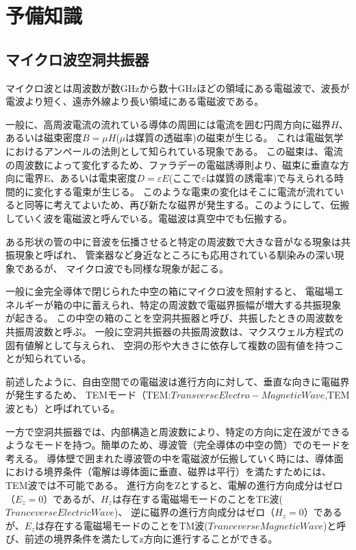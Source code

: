 \section{予備知識}
\subsection*{マイクロ波空洞共振器}
マイクロ波とは周波数が数GHzから数十GHzほどの領域にある電磁波で、波長が電波より短く、遠赤外線より長い領域にある電磁波である。

一般に、高周波電流の流れている導体の周囲には電流を囲む円周方向に磁界$H$、あるいは磁束密度$B =μH$($μ$は媒質の透磁率)の磁束が生じる。
これは電磁気学におけるアンペールの法則として知られている現象である。
この磁束は、電流の周波数によって変化するため、ファラデーの電磁誘導則より、磁束に垂直な方向に電界E、あるいは電束密度$D =εE$(ここで$ε$は媒質の誘電率)で与えられる時間的に変化する電束が生じる。
このような電束の変化はそこに電流が流れていると同等に考えてよいため、再び新たな磁界が発生する。このようにして、伝搬していく波を電磁波と呼んでいる。電磁波は真空中でも伝搬する。

ある形状の管の中に音波を伝播させると特定の周波数で大きな音がなる現象は共振現象と呼ばれ、
管楽器など身近なところにも応用されている馴染みの深い現象であるが、
マイクロ波でも同様な現象が起こる。

一般に金完全導体で閉じられた中空の箱にマイクロ波を照射すると、
電磁場エネルギーが箱の中に蓄えられ、特定の周波数で電磁界振幅が増大する共振現象が起きる。
この中空の箱のことを空洞共振器と呼び、共振したときの周波数を共振周波数と呼ぶ。
一般に空洞共振器の共振周波数は、マクスウェル方程式の固有値解として与えられ、
空洞の形や大きさに依存して複数の固有値を持つことが知られている。

前述したように、自由空間での電磁波は進行方向に対して、垂直な向きに電磁界が発生するため、
TEMモード（TEM:$Transverse Electro-Magnetic Wave$,TEM波とも）と呼ばれている。

一方で空洞共振器では、内部構造と周波数により、特定の方向に定在波ができるようなモードを持つ。簡単のため、導波管（完全導体の中空の筒）でのモードを考える。
導体壁で囲まれた導波管の中を電磁波が伝搬していく時には、導体面における境界条件（電解は導体面に垂直、磁界は平行）を満たすためには、TEM波では不可能である。
進行方向をZとすると、電解の進行方向成分はゼロ（$E_z = 0$）であるが、$H_z$は存在する電磁場モードのことをTE波($Tranceverse Electric Wave$)、
逆に磁界の進行方向成分はゼロ（$H_z=0$）であるが、$E_z$は存在する電磁場モードのことをTM波($Tranceverse Magnetic Wave$)と呼び、前述の境界条件を満たしてz方向に進行することができる。


